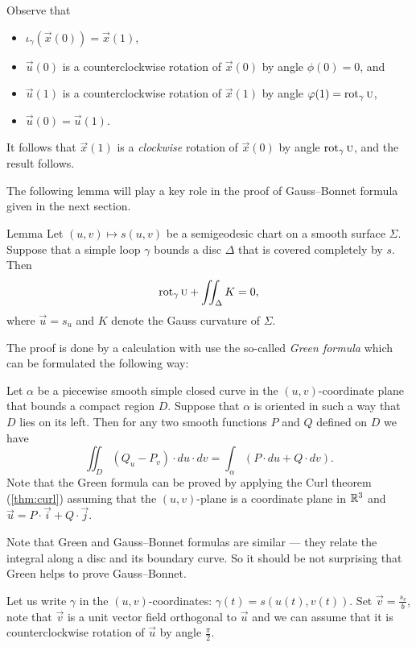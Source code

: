 Observe that 
\begin{itemize}
\item $\iota_\gamma(\vec x(0))=\vec x(1)$,

\item $\vec u(0)$ is a counterclockwise rotation of $\vec x(0)$ by angle $\phi(0)=0$, and 

\item $\vec u(1)$ is a counterclockwise rotation of $\vec x(1)$ by angle $\phi(1)\z=\rot_\gamma\vec u$,

\item $\vec u(0)=\vec u(1)$.
\end{itemize}
It follows that $\vec x(1)$ is a {}\emph{clockwise} rotation of $\vec x(0)$ by angle $\mathop{\rm rot}\nolimits_\gamma\textsc u$, and the result follows.
\qeds

The following lemma will play a key role in the proof of Gauss--Bonnet formula given in the next section.

\begin{thm}{Lemma}\label{lem:rotation-semigeoesic}
Let $(u,v)\mapsto s(u,v)$ be a semigeodesic chart on a smooth surface $\Sigma$.
Suppose that a simple loop $\gamma$ bounds a disc $\Delta$ that is covered completely by $s$.
Then 
\[\mathop{\rm rot}\nolimits_\gamma\textsc u+\iint_\Delta K=0,\]
where $\vec u=s_u$ and $K$ denote the Gauss curvature of $\Sigma$.
\end{thm}

The proof is done by a calculation with use the so-called \emph{Green formula} which can be formulated the following way:

Let $\alpha$ be a piecewise smooth simple closed curve in the $(u,v)$-coordinate plane that bounds a compact region $D$.
Suppose that $\alpha$ is oriented in such a way that $D$ lies on its left.
Then for any two smooth functions $P$ and $Q$ defined on $D$ we have
\[\iint_D (Q_u- P_v)\cdot du\cdot dv=\int_\alpha (P\cdot du+Q\cdot dv).\]
Note that the Green formula can be proved by applying the Curl theorem (\ref{thm:curl}) assuming that the $(u,v)$-plane is a coordinate plane in $\mathbb{R}^3$ and $\vec u=P\cdot\vec i+Q\cdot \vec j$.

Note that Green and Gauss--Bonnet formulas are similar --- they relate the integral along a disc and its boundary curve.
So it should be not surprising that Green helps to prove Gauss--Bonnet.

Let us write $\gamma$ in the $(u,v)$-coordinates: $\gamma(t)=s(u(t),v(t))$. Set $\vec v=\tfrac{s_v}{b}$, note that $\vec v$ is a unit vector field orthogonal to $\vec u$ and we can assume that it is counterclockwise rotation of $\vec u$ by angle $\tfrac{\pi}2$.

